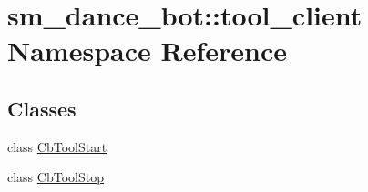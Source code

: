 \hypertarget{namespacesm__dance__bot_1_1tool__client}{}\section{sm\+\_\+dance\+\_\+bot\+:\+:tool\+\_\+client Namespace Reference}
\label{namespacesm__dance__bot_1_1tool__client}
\subsection*{Classes}
\begin{DoxyCompactItemize}
\item 
class \hyperlink{classsm__dance__bot_1_1tool__client_1_1CbToolStart}{Cb\+Tool\+Start}
\item 
class \hyperlink{classsm__dance__bot_1_1tool__client_1_1CbToolStop}{Cb\+Tool\+Stop}
\end{DoxyCompactItemize}
